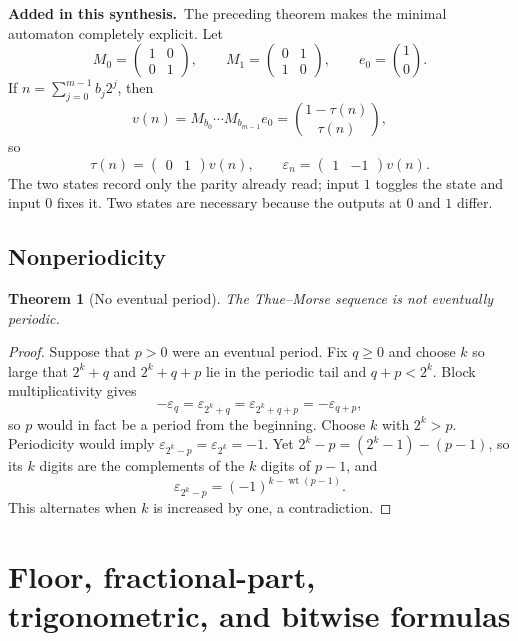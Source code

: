 \documentclass[11pt,oneside]{article}
\numberwithin{equation}{section}
\newtheorem{theorem}{Theorem}[section]
\theoremstyle{definition}
\theoremstyle{remark}
\newcommand{\wt}{\operatorname{wt}}
\newcommand{\eps}{\varepsilon}
\newcommand{\TM}{\tau}
\newcommand{\newmaterial}{\textcolor{AtlasBlue}{\textbf{Added in this synthesis.}}\ }
\begin{document}
\newmaterial The preceding theorem makes the minimal automaton completely
explicit.  Let
\[
 M_0=\begin{pmatrix}1&0\\0&1\end{pmatrix},\qquad
 M_1=\begin{pmatrix}0&1\\1&0\end{pmatrix},\qquad e_0=\binom10.
\]
If \(n=\sum_{j=0}^{m-1}b_j2^j\), then
\begin{equation}
 v(n)=M_{b_0}\cdots M_{b_{m-1}}e_0
 =\binom{1-\TM(n)}{\TM(n)},
 \label{eq:automaton-vector}
\end{equation}
so
\begin{equation}
 \TM(n)=\begin{pmatrix}0&1\end{pmatrix}v(n),\qquad
 \eps_n=\begin{pmatrix}1&-1\end{pmatrix}v(n).
 \label{eq:automaton-output}
\end{equation}
The two states record only the parity already read; input \(1\) toggles the
state and input \(0\) fixes it.  Two states are necessary because the outputs
at \(0\) and \(1\) differ.

\subsection{Nonperiodicity}

\begin{theorem}[No eventual period]
The Thue--Morse sequence is not eventually periodic.
\end{theorem}

\begin{proof}
Suppose that \(p>0\) were an eventual period.  Fix \(q\ge0\) and choose
\(k\) so large that \(2^k+q\) and \(2^k+q+p\) lie in the periodic tail and
\(q+p<2^k\).  Block multiplicativity gives
\[
 -\eps_q=\eps_{2^k+q}=\eps_{2^k+q+p}=-\eps_{q+p},
\]
so \(p\) would in fact be a period from the beginning.  Choose \(k\) with
\(2^k>p\).  Periodicity would imply
\(\eps_{2^k-p}=\eps_{2^k}=-1\).  Yet
\(2^k-p=(2^k-1)-(p-1)\), so its \(k\) digits are the complements of the
\(k\) digits of \(p-1\), and
\[
 \eps_{2^k-p}=(-1)^{k-\wt(p-1)}.
\]
This alternates when \(k\) is increased by one, a contradiction.
\end{proof}

\section{Floor, fractional-part, trigonometric, and bitwise formulas}
\label{sec:digits}
\end{document}
